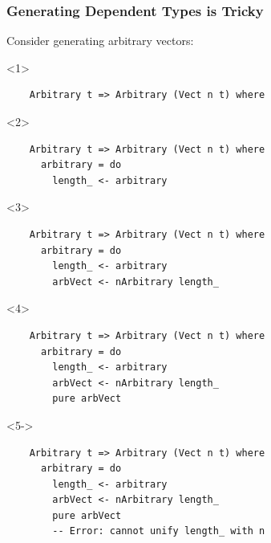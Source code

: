 \documentclass[compress]{beamer}
\begin{document}
\begin{frame}[fragile]
  \frametitle{Generating Dependent Types is Tricky}

  \large
  
  Consider generating arbitrary vectors:

  \begin{onlyenv}<1>
  \begin{verbatim}
    Arbitrary t => Arbitrary (Vect n t) where
  \end{verbatim}
  \end{onlyenv}

  \begin{onlyenv}<2>
  \begin{verbatim}
    Arbitrary t => Arbitrary (Vect n t) where
      arbitrary = do
        length_ <- arbitrary
  \end{verbatim}
  \end{onlyenv}

  \begin{onlyenv}<3>
  \begin{verbatim}
    Arbitrary t => Arbitrary (Vect n t) where
      arbitrary = do
        length_ <- arbitrary
        arbVect <- nArbitrary length_
  \end{verbatim}
  \end{onlyenv}

  \begin{onlyenv}<4>
  \begin{verbatim}
    Arbitrary t => Arbitrary (Vect n t) where
      arbitrary = do
        length_ <- arbitrary
        arbVect <- nArbitrary length_
        pure arbVect
  \end{verbatim}
  \end{onlyenv}

  \begin{onlyenv}<5->
  \begin{verbatim}
    Arbitrary t => Arbitrary (Vect n t) where
      arbitrary = do
        length_ <- arbitrary
        arbVect <- nArbitrary length_
        pure arbVect
        -- Error: cannot unify length_ with n
  \end{verbatim}
  \end{onlyenv}

  \vspace*{1mm}
  \begin{center}
  \end{center}

\end{frame}
\end{document}
